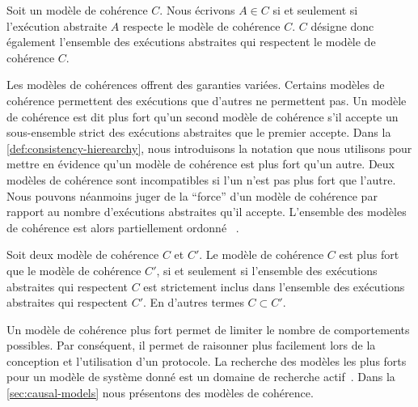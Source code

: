 \begin{definition}\label{def:consistency-model}
Soit un modèle de cohérence $C$.
Nous écrivons $A \in C$ si et seulement si l'exécution abstraite $A$ respecte le modèle de cohérence $C$.
$C$ désigne donc également l'ensemble des exécutions abstraites qui respectent le modèle de cohérence $C$.
\end{definition}


Les modèles de cohérences offrent des garanties variées.
Certains modèles de cohérence permettent des exécutions que d'autres ne permettent pas.
Un modèle de cohérence est dit plus fort qu'un second modèle de cohérence s'il accepte un sous-ensemble strict des exécutions abstraites que le premier accepte.
Dans la \autoref{def:consistency-hierearchy}, nous introduisons la notation que nous utilisons pour mettre en évidence qu'un modèle de cohérence est plus fort qu'un autre.
Deux modèles de cohérence sont incompatibles si l'un n'est pas plus fort que l'autre.
Nous pouvons néanmoins juger de la \enquote{force} d'un modèle de cohérence par rapport au nombre d'exécutions abstraites qu'il accepte.
L'ensemble des modèles de cohérence est alors partiellement ordonné
~\autocite{viotti_consistency_2016}.

\begin{definition}\label{def:consistency-hierearchy}
Soit deux modèle de cohérence $C$ et $C'$.
Le modèle de cohérence $C$ est plus fort que le modèle de cohérence $C'$, si et seulement si l'ensemble des exécutions abstraites qui respectent $C$ est strictement inclus dans l'ensemble des exécutions abstraites qui respectent $C'$.
En d'autres termes $C \subset C'$.
\end{definition}

Un modèle de cohérence plus fort permet de limiter le nombre de comportements possibles.
Par conséquent, il permet de raisonner plus facilement lors de la conception et l'utilisation d'un protocole.
La recherche des modèles les plus forts pour un modèle de système donné est un domaine de recherche actif~\cite{mahajan_2011_cac,guerraoui_2016_tradeoffs-replication,viotti_consistency_2016}.
Dans la \autoref{sec:causal-models} nous présentons des modèles de cohérence.



